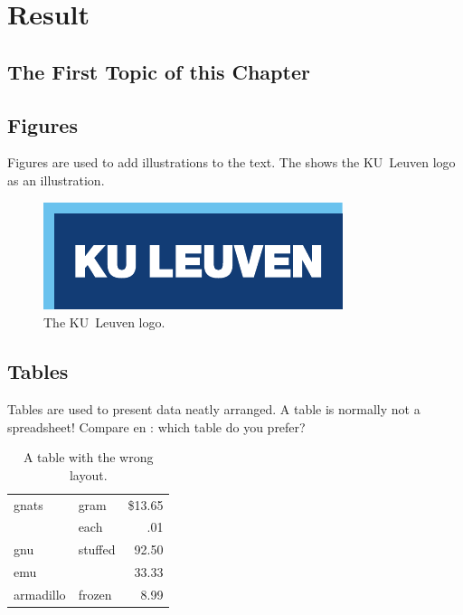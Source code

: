 \chapter{Result}
\label{cha:4}


\section{The First Topic of this Chapter}
\lipsum[78]


\section{Figures}
Figures are used to add illustrations to the text. The  shows
the KU~Leuven logo as an illustration.
\begin{figure}
	\centering
	\includegraphics{logokul}
	\caption{The KU~Leuven logo.}
	\label{fig:logo}
\end{figure}

\section{Tables}
Tables are used to present data neatly arranged. A table is normally
not a spreadsheet! Compare  en : which table do
you prefer?

\begin{table}
	\centering
	\begin{tabular}{||l|lr||} \hline
		gnats     & gram      & \$13.65 \\ \cline{2-3}
		& each      & .01 \\ \hline
		gnu       & stuffed   & 92.50 \\ \cline{1-1} \cline{3-3}
		emu       &           & 33.33 \\ \hline
		armadillo & frozen    & 8.99 \\ \hline
	\end{tabular}
	\caption{A table with the wrong layout.}
	\label{tab:wrong}
\end{table}

